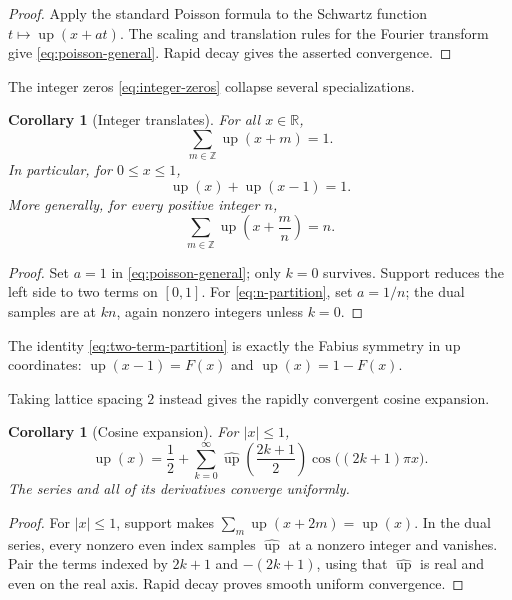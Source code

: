 \documentclass[11pt,oneside]{article}
\newtheorem{corollary}[theorem]{Corollary}
\theoremstyle{definition}
\theoremstyle{remark}
\newcommand{\upf}{\operatorname{up}}
\newcommand{\Z}{\mathbb Z}
\newcommand{\R}{\mathbb R}
\newcommand{\Fourier}{\widehat{\upf}}
\begin{document}
\begin{proof}
Apply the standard Poisson formula to the Schwartz function
$t\mapsto\upf(x+at)$.  The scaling and translation rules for the Fourier transform
give \eqref{eq:poisson-general}.  Rapid decay gives the asserted convergence.
\end{proof}

The integer zeros \eqref{eq:integer-zeros} collapse several specializations.

\begin{corollary}[Integer translates]\label{cor:partition-unity}
For all $x\in\R$,
\begin{equation}\label{eq:partition-unity}
  \sum_{m\in\Z}\upf(x+m)=1.
\end{equation}
In particular, for $0\le x\le1$,
\begin{equation}\label{eq:two-term-partition}
  \upf(x)+\upf(x-1)=1.
\end{equation}
More generally, for every positive integer $n$,
\begin{equation}\label{eq:n-partition}
  \sum_{m\in\Z}\upf\left(x+\frac{m}{n}\right)=n.
\end{equation}
\end{corollary}

\begin{proof}
Set $a=1$ in \eqref{eq:poisson-general}; only $k=0$ survives.  Support reduces the
left side to two terms on $[0,1]$.  For \eqref{eq:n-partition}, set $a=1/n$;
the dual samples are at $kn$, again nonzero integers unless $k=0$.
\end{proof}

The identity \eqref{eq:two-term-partition} is exactly the Fabius symmetry in up
coordinates: $\upf(x-1)=F(x)$ and $\upf(x)=1-F(x)$.

Taking lattice spacing $2$ instead gives the rapidly convergent cosine expansion.

\begin{corollary}[Cosine expansion]\label{cor:cosine-expansion}
For $|x|\le1$,
\begin{equation}\label{eq:up-cosine-series}
  \upf(x)=\frac12+
  \sum_{k=0}^{\infty}
  \Fourier\left(\frac{2k+1}{2}\right)
  \cos\bigl((2k+1)\pi x\bigr).
\end{equation}
The series and all of its derivatives converge uniformly.
\end{corollary}

\begin{proof}
For $|x|\le1$, support makes
$\sum_m\upf(x+2m)=\upf(x)$.  In the dual series, every nonzero even index samples
$\Fourier$ at a nonzero integer and vanishes.  Pair the terms indexed by
$2k+1$ and $-(2k+1)$, using that $\Fourier$ is real and even on the real axis.
Rapid decay proves smooth uniform convergence.
\end{proof}
\end{document}
